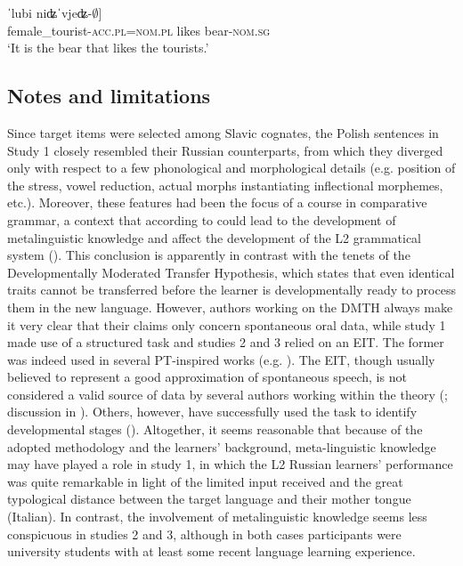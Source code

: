 \documentclass[output=paper,            colorlinks, citecolor=brown            		  ]{langscibook}
\begin{document}
\begin{exe}%
    \gll {[tuˈristk-i}         ˈlubi  {niʥˈvjeʥ-${\emptyset}$]}\\
  female\_tourist-\textsc{acc.pl=nom.pl}    likes  bear-\textsc{nom.sg}\\
    \glt ‘It is the bear that likes the tourists.’
\end{exe}

\subsection{Notes and limitations}\label{sec:saturno:4.3}

Since target items were selected among Slavic cognates, the Polish sentences in Study 1 closely resembled their Russian counterparts, from which they diverged only with respect to a few phonological and morphological details (e.g. position of the stress, vowel reduction, actual morphs instantiating inflectional morphemes, etc.). Moreover, these features had been the focus of a course in comparative grammar, a context that according to \citet{Paradis2009} could lead to the development of metalinguistic knowledge and affect the development of the L2 grammatical system (\citealt{FalkEtAl2015, Bardel2019}). This conclusion is apparently in contrast with the tenets of the Developmentally Moderated Transfer Hypothesis, which states that even identical traits cannot be transferred before the learner is developmentally ready to process them in the new language. However, authors working on the DMTH always make it very clear that their claims only concern spontaneous oral data, while study 1 made use of a structured task and studies 2 and 3 relied on an EIT. The former was indeed used in several PT-inspired works (e.g. \citealt{DiBiaseKawaguchi2002, BettoniDiBiase2011, ArtoniMagnani2015}). The EIT, though usually believed to represent a good approximation of spontaneous speech, is not considered a valid source of data by several authors working within the theory (\citealt{Pienemann2015, LantolfZhang2015}; discussion in \citealt{Saturno2019a}). Others, however, have successfully used the task to identify developmental stages (\citealt{BatenCornillie2019}). Altogether, it seems reasonable that because of the adopted methodology and the learners’ background, meta-linguistic knowledge may have played a role in study 1, in which the L2 Russian learners’ performance was quite remarkable in light of the limited input received and the great typological distance between the target language and their mother tongue (Italian). In contrast, the involvement of metalinguistic knowledge seems less conspicuous in studies 2 and 3, although in both cases participants were university students with at least some recent language learning experience.
\end{document}
